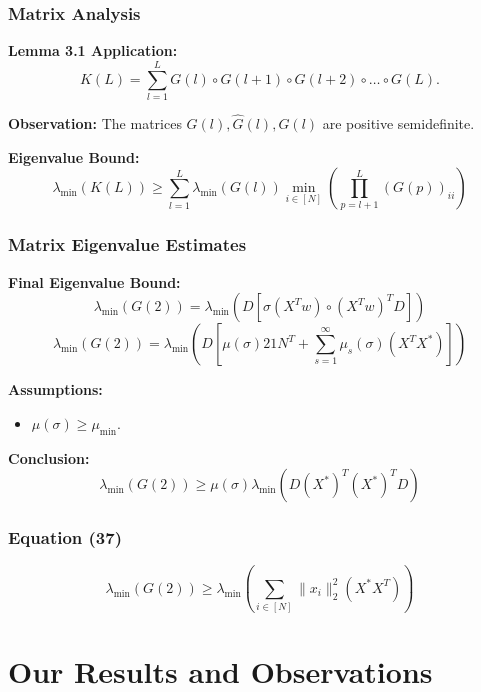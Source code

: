 \documentclass[serif, aspectratio=169]{beamer}
\begin{document}
\begin{frame}
\frametitle{Matrix Analysis}

\textbf{Lemma 3.1 Application:}
\[
K(L) = \sum_{l=1}^{L} G(l) \circ G(l+1) \circ G(l+2) \circ \dots \circ G(L).
\]

\textbf{Observation:} The matrices \( G(l), \hat{G}(l), G(l) \) are positive semidefinite.

\vspace{0.5cm}

\textbf{Eigenvalue Bound:}
\[
\lambda_{\min}( K(L) ) \geq \sum_{l=1}^{L} \lambda_{\min}( G(l) ) \min_{i \in [N]} \left( \prod_{p=l+1}^L (G(p))_{ii} \right)
\]

\end{frame}

\begin{frame}
\frametitle{Matrix Eigenvalue Estimates}

\textbf{Final Eigenvalue Bound:}
\[
\lambda_{\min}( G(2) ) = \lambda_{\min}( D \left[ \sigma(X^T w) \circ ( X^T w )^T D \right] )
\]
\[
\lambda_{\min}( G(2) ) = \lambda_{\min}( D \left[ \mu(\sigma) 21N^T + \sum_{s=1}^{\infty} \mu_s(\sigma) (X^T X^*) \right] )
\]

\textbf{Assumptions:}
\begin{itemize}
	\item \( \mu(\sigma) \geq \mu_{\text{min}} \).
\end{itemize}

\vspace{0.5cm}

\textbf{Conclusion:}
\[
\lambda_{\min}( G(2) ) \geq \mu(\sigma) \lambda_{\min}( D(X^*)^T (X^*)^T D )
\]

\end{frame}

\begin{frame}
\frametitle{Equation (37)}

\[
\lambda_{\min} \left( G(2) \right) \geq \lambda_{\min} \left( \sum_{i \in [N]} \| x_i \|^2_2 (X^* X^T) \right)
\]

\end{frame}




\section{Our Results and Observations}
\end{document}
